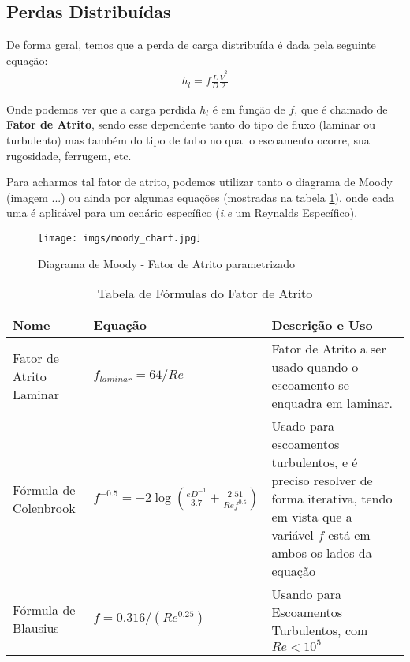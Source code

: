\documentclass{article}
\begin{document}
\newpage
\subsection{Perdas Distribuídas}

De forma geral, temos que a perda de carga distribuída é dada pela seguinte equação:
\begin{align}
    h_{l} = f \frac{L}{D}\frac{\bar{V}^2}{2}
    \label{eq:perda_carga_distribuida}
\end{align}

Onde podemos ver que a carga perdida $h_l$ é em função de $f$, que é chamado de \textbf{Fator de Atrito}, sendo esse dependente tanto do tipo de fluxo (laminar ou turbulento) mas também do tipo de tubo no qual o escoamento ocorre, sua rugosidade, ferrugem, etc.

Para acharmos tal fator de atrito, podemos utilizar tanto o diagrama de Moody (imagem ...) ou ainda por algumas equações (mostradas na tabela \ref{tab:fator_atrito}), onde cada uma é aplicável para um cenário específico (\emph{i.e} um Reynalds Específico).

\begin{figure}[h]
    \centering
    \texttt{[image: imgs/moody\_chart.jpg]}
    \caption{Diagrama de Moody - Fator de Atrito parametrizado}
\end{figure}


\begin{table}[h]
    \begin{tabularx}{\textwidth}{|X|X|X|}\hline
        \textbf{Nome}           & \textbf{Equação}                                                               & \textbf{Descrição e Uso}                                                                                                                         \\ \hline
        Fator de Atrito Laminar & $f_{laminar} = 64/Re$                                                          & Fator de Atrito a ser usado quando o escoamento se enquadra em laminar.                                                                          \\ \hline
        Fórmula de Colenbrook   & $f^{-0.5} = -2 \log\left(\frac{eD^{-1}}{3.7} + \frac{2.51}{Re f^{0.5}}\right)$ & Usado para escoamentos turbulentos, e é preciso resolver de forma iterativa, tendo em vista que a variável $f$ está em ambos os lados da equação \\ \hline
        Fórmula de Blausius     & $f = 0.316/(Re^{0.25})$                                                        & Usando para Escoamentos Turbulentos, com $Re<10^5$                                                                                               \\ \hline
    \end{tabularx}
    \caption{Tabela de Fórmulas do Fator de Atrito}
    \label{tab:fator_atrito}
\end{table}
\end{document}
